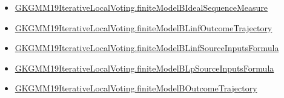 \documentclass[10pt]{article}
\begin{document}
\begin{itemize}
\item \hyperlink{governing-declaration-4a521de5e9fb0dd0}{GKGMM19\allowbreak{}Iterative\allowbreak{}Local\allowbreak{}Voting.\allowbreak{}finite\allowbreak{}Model\allowbreak{}B\allowbreak{}Ideal\allowbreak{}Sequence\allowbreak{}Measure}
\item \hyperlink{governing-declaration-dd7da357d9690754}{GKGMM19\allowbreak{}Iterative\allowbreak{}Local\allowbreak{}Voting.\allowbreak{}finite\allowbreak{}Model\allowbreak{}B\allowbreak{}Linf\allowbreak{}Outcome\allowbreak{}Trajectory}
\item \hyperlink{governing-declaration-4d7ded2f77d1d03d}{GKGMM19\allowbreak{}Iterative\allowbreak{}Local\allowbreak{}Voting.\allowbreak{}finite\allowbreak{}Model\allowbreak{}B\allowbreak{}Linf\allowbreak{}Source\allowbreak{}Inputs\allowbreak{}Formula}
\item \hyperlink{governing-declaration-7910c34249d682bd}{GKGMM19\allowbreak{}Iterative\allowbreak{}Local\allowbreak{}Voting.\allowbreak{}finite\allowbreak{}Model\allowbreak{}B\allowbreak{}Lp\allowbreak{}Source\allowbreak{}Inputs\allowbreak{}Formula}
\item \hyperlink{governing-declaration-afdf8d45bd28d786}{GKGMM19\allowbreak{}Iterative\allowbreak{}Local\allowbreak{}Voting.\allowbreak{}finite\allowbreak{}Model\allowbreak{}B\allowbreak{}Outcome\allowbreak{}Trajectory}
\end{itemize}
\end{document}

